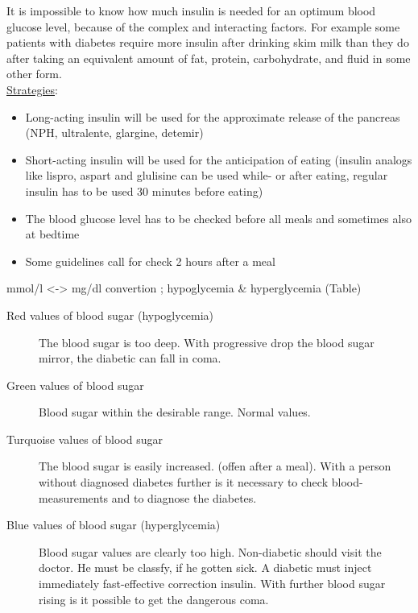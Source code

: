 It is impossible to know how much insulin is needed for an optimum blood glucose level, because of the complex and 
interacting factors. For example some patients with diabetes require more insulin after drinking skim milk than 
they do after taking an equivalent amount of fat, protein, carbohydrate, and fluid in some other form.\\
\newpage
\underline{Strategies}:\\
\begin{itemize}
  \item Long-acting insulin will be used for the approximate release of the pancreas (NPH, ultralente, glargine, detemir)
  \item Short-acting insulin will be used for the anticipation of eating (insulin analogs like lispro, aspart and 
	  glulisine can be used while- or after eating, regular insulin has to be used 30 minutes before eating)
  \item The blood glucose level has to be checked before all meals and sometimes also at bedtime
  \item Some guidelines call for check 2 hours after a meal
\end{itemize}
mmol/l <-> mg/dl convertion ; hypoglycemia \& hyperglycemia (Table)\\
\begin{description}
  \item[Red values of blood sugar (hypoglycemia)] The blood sugar is too deep. With progressive drop the blood sugar mirror, the diabetic can fall in coma.
  \item[Green values of blood sugar] Blood sugar within the desirable range. Normal values.
  \item[Turquoise values of blood sugar] The blood sugar is easily increased. (offen after a meal). With a person without diagnosed diabetes further is it necessary to check blood-measurements and to diagnose the diabetes.
  \item[Blue values of blood sugar (hyperglycemia)] Blood sugar values are clearly too high. Non-diabetic should visit the doctor. 
He must be classfy, if he gotten sick. A diabetic must inject immediately fast-effective correction insulin. 
With further blood sugar rising is it possible to get the dangerous coma.
\end{description}
